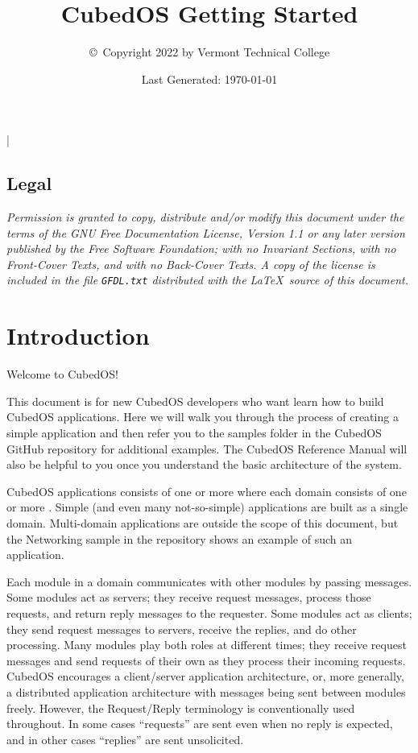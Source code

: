 \documentclass{scrreprt}
\begin{document}
\title{CubedOS Getting Started}
\author{\copyright\ Copyright 2022 by Vermont Technical College}
\date{Last Generated: \today}
\maketitle

\tableofcontents

\lstMakeShortInline|

\section*{Legal}
\label{sec:legal}

\textit{Permission is granted to copy, distribute and/or modify this document under the terms of
  the GNU Free Documentation License, Version 1.1 or any later version published by the Free
  Software Foundation; with no Invariant Sections, with no Front-Cover Texts, and with no
  Back-Cover Texts. A copy of the license is included in the file \texttt{GFDL.txt} distributed
  with the \LaTeX\ source of this document.}

\chapter{Introduction}

Welcome to CubedOS!

This document is for new CubedOS developers who want learn how to build CubedOS applications. Here we will walk you through the process of creating a simple application and then refer you to the samples folder in the CubedOS GitHub repository for additional examples. The CubedOS Reference Manual will also be helpful to you once you understand the basic architecture of the system.

CubedOS applications consists of one or more  where each domain consists of one or more . Simple (and even many not-so-simple) applications are built as a single domain. Multi-domain applications are outside the scope of this document, but the Networking sample in the repository shows an example of such an application.

Each module in a domain communicates with other modules by passing messages. Some modules act as servers; they receive request messages, process those requests, and return reply messages to the requester. Some modules act as clients; they send request messages to servers, receive the replies, and do other processing. Many modules play both roles at different times; they receive request messages and send requests of their own as they process their incoming requests. CubedOS encourages a client/server application architecture, or, more generally, a distributed application architecture with messages being sent between modules freely. However, the Request/Reply terminology is conventionally used throughout. In some cases ``requests'' are sent even when no reply is expected, and in other cases ``replies'' are sent unsolicited.
\end{document}
